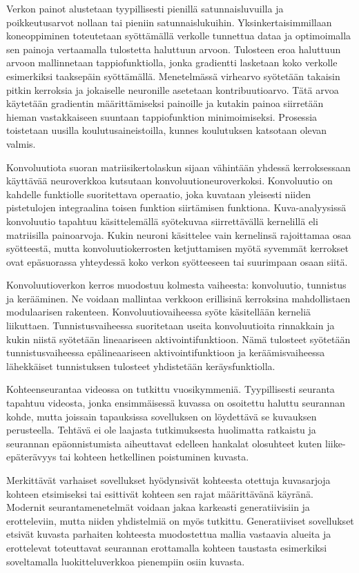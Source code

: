 Verkon painot alustetaan tyypillisesti pienillä satunnaisluvuilla ja poikkeutusarvot nollaan
tai pieniin satunnaislukuihin. Yksinkertaisimmillaan koneoppiminen toteutetaan syöttämällä
verkolle tunnettua dataa ja optimoimalla sen painoja vertaamalla tulostetta haluttuun arvoon.
Tulosteen eroa haluttuun arvoon mallinnetaan tappiofunktiolla, jonka gradientti lasketaan
koko verkolle esimerkiksi taaksepäin syöttämällä. Menetelmässä virhearvo syötetään takaisin
pitkin kerroksia ja jokaiselle neuronille asetetaan kontribuutioarvo. Tätä arvoa käytetään
gradientin määrittämiseksi painoille ja kutakin painoa siirretään hieman vastakkaiseen suuntaan
tappiofunktion minimoimiseksi. Prosessia toistetaan uusilla koulutusaineistoilla, kunnes
koulutuksen katsotaan olevan valmis.

Konvoluutiota suoran matriisikertolaskun sijaan vähintään yhdessä kerroksessaan käyttävää
neuroverkkoa kutsutaan konvoluutioneuroverkoksi. Konvoluutio on kahdelle funktiolle suoritettava
operaatio, joka kuvataan yleisesti niiden pistetulojen integraalina toisen funktion
siirtämisen funktiona. Kuva-analyysissä konvoluutio tapahtuu käsittelemällä syötekuvaa
siirrettävällä kernelillä eli matriisilla painoarvoja. Kukin neuroni käsittelee vain
kernelinsä rajoittamaa osaa syötteestä, mutta konvoluutiokerrosten ketjuttamisen myötä
syvemmät kerrokset ovat epäsuorassa yhteydessä koko verkon syötteeseen tai suurimpaan
osaan siitä.

Konvoluutioverkon kerros muodostuu kolmesta vaiheesta: konvoluutio, tunnistus ja kerääminen.
Ne voidaan mallintaa verkkoon erillisinä kerroksina mahdollistaen modulaarisen rakenteen.
Konvoluutiovaiheessa syöte käsitellään kerneliä liikuttaen. Tunnistusvaiheessa suoritetaan
useita konvoluutioita rinnakkain ja kukin niistä syötetään lineaariseen aktivointifunktioon.
Nämä tulosteet syötetään tunnistusvaiheessa epälineaariseen aktivointifunktioon ja
keräämisvaiheessa lähekkäiset tunnistuksen tulosteet yhdistetään keräysfunktiolla.

Kohteenseurantaa videossa on tutkittu vuosikymmeniä. Tyypillisesti seuranta tapahtuu videosta,
jonka ensimmäisessä kuvassa on osoitettu haluttu seurannan kohde, mutta joissain tapauksissa
sovelluksen on löydettävä se kuvauksen perusteella. Tehtävä ei ole laajasta tutkimuksesta
huolimatta ratkaistu ja seurannan epäonnistumista aiheuttavat edelleen hankalat olosuhteet
kuten liike-epäterävyys tai kohteen hetkellinen poistuminen kuvasta.

Merkittävät varhaiset sovellukset hyödynsivät kohteesta otettuja kuvasarjoja kohteen etsimiseksi
tai esittivät kohteen sen rajat määrittävänä käyränä. Modernit seurantamenetelmät voidaan jakaa
karkeasti generatiivisiin ja erotteleviin, mutta niiden yhdistelmiä on myös tutkittu. Generatiiviset
sovellukset etsivät kuvasta parhaiten kohteesta muodostettua mallia vastaavia alueita ja erottelevat
toteuttavat seurannan erottamalla kohteen taustasta esimerkiksi soveltamalla luokitteluverkkoa
pienempiin osiin kuvasta.

